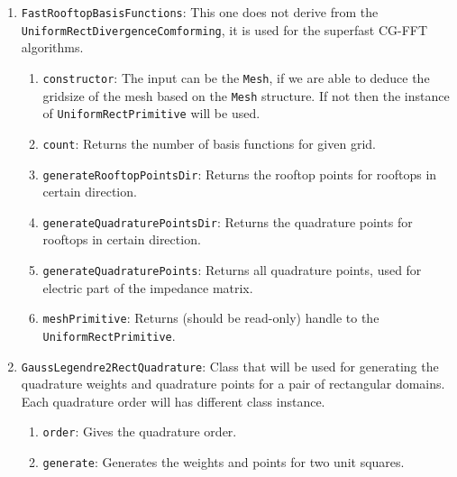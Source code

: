 \documentclass[9pt]{article}
\begin{document}
\begin{enumerate}[label=\Roman*.]
\begin{enumerate}[label=\roman*.]
            \item <<TMP>> \texttt{rooftopSizes}: For each of the rooftops gives domain rectangle dimensions, each size is given an index, which will be used for construction of the jacobi mask.
            \item <<TMP>> \texttt{rooftopSizesUniquePerms}: Returns the vector of unique rooftop sizes, permutations of the sizes included (needed for the singularity extraction).
            \item <<TMP>> \texttt{rooftopSizesUniqueCombs}: Returns the vector of unique rooftop sizes, unordered, used for jacobi mask.
        \end{enumerate}
        \item \texttt{FastRooftopBasisFunctions}: This one does not derive from the \texttt{UniformRectDivergenceComforming}, it is used for the superfast CG-FFT algorithms.
        \begin{enumerate}[label=\roman*.]
            \item \texttt{constructor}: The input can be the \texttt{Mesh}, if we are able to deduce the gridsize of the mesh based on the \texttt{Mesh} structure. If not then the instance of \texttt{UniformRectPrimitive} will be used.
            \item \texttt{count}: Returns the number of basis functions for given grid.
            \item \texttt{generateRooftopPointsDir}: Returns the rooftop points for rooftops in certain direction.
            \item \texttt{generateQuadraturePointsDir}: Returns the quadrature points for rooftops in certain direction.
            \item \texttt{generateQuadraturePoints}: Returns all quadrature points, used for electric part of the impedance matrix.
            \item \texttt{meshPrimitive}: Returns (should be read-only) handle to the \texttt{UniformRectPrimitive}.
        \end{enumerate}
        \item \texttt{GaussLegendre2RectQuadrature}: Class that will be used for generating the quadrature weights and quadrature points for a pair of rectangular domains. Each quadrature order will has different class instance.
        \begin{enumerate}[label=\roman*.]
            \item \texttt{order}: Gives the quadrature order.
            \item \texttt{generate}: Generates the weights and points for two unit squares.

\end{enumerate}
\end{enumerate}
\end{document}

